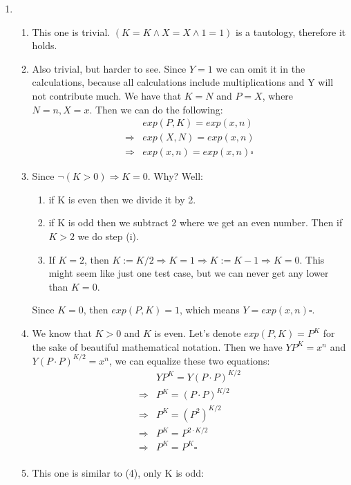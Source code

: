 \documentclass[a4paper]{article}
\begin{document}
\begin{enumerate}[label=(\alph*)]
    \item 
    \begin{enumerate}[label=(\arabic*)]
        \item This one is trivial. $(K=K\wedge X=X\wedge 1=1)$ is a tautology, therefore it holds.
        \item Also trivial, but harder to see. Since $Y=1$ we can omit it in the calculations, because all calculations include multiplications and Y will not contribute much. We have that $K=N$ and $P=X$, where $N=n,X=x$. Then we can do the following:
        \begin{align*}
            &exp(P,K)=exp(x,n)\\
            \Rightarrow&exp(X,N)=exp(x,n)\\
            \Rightarrow&exp(x,n)=exp(x,n)\square
        \end{align*}
        \item Since $\neg (K>0)\Rightarrow K=0$. Why? Well:
        \begin{enumerate}[label=(\roman*)]
            \item if K is even then we divide it by 2.
            \item if K is odd then we subtract 2 where we get an even number. Then if $K>2$ we do step (i).
            \item If $K=2$, then $K:=K/2\Rightarrow K=1\Rightarrow K:=K-1\Rightarrow K=0$. This might seem like just one test case, but we can never get any lower than $K=0$.
        \end{enumerate}
        Since $K=0$, then $exp(P,K)=1$, which means $Y=exp(x,n)\square$.
        \item We know that $K>0$ and $K$ is even. Let's denote $exp(P,K)=P^K$ for the sake of beautiful mathematical notation. Then we have $YP^K=x^n$ and $Y(P\cdot P)^{K/2}=x^n$, we can equalize these two equations:
        \begin{align*}
            &YP^K=Y(P\cdot P)^{K/2}\\
            \Rightarrow&P^K=(P\cdot P)^{K/2}\\
            \Rightarrow&P^K=(P^2)^{K/2}\\
            \Rightarrow&P^K=P^{2\cdot K/2}\\
            \Rightarrow&P^K=P^K\square\\
        \end{align*}
        \item This one is similar to (4), only K is odd:
        \begin{align*}

\end{align*}
\end{enumerate}
\end{enumerate}
\end{document}
